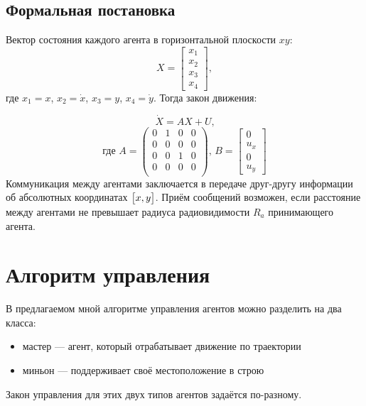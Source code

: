 \documentclass[a4paper, 14pt]{extarticle}
\let\Oldsection\section
\renewcommand{\section}{\FloatBarrier\Oldsection}
\let\Oldsubsection\subsection
\renewcommand{\subsection}{\FloatBarrier\Oldsubsection}
\begin{document}
\subsection{Формальная постановка}
Вектор состояния каждого агента в горизонтальной плоскости $xy$:
$$ X = 
\begin{bmatrix}
	x_1 \\
	x_2 \\
	x_3 \\
	x_4
\end{bmatrix} ,
$$
где $x_1 = x$, $x_2 = \dot{x}$, $x_3 = y$, $x_4 = \dot{y}$. Тогда закон движения: \par
$$\dot{X} = AX + U\text{,}$$
$$\text{где } A =  \left(\begin{array}{cccc} 0 & 1 & 0 & 0 \\ 0 & 0 & 0 & 0 \\ 0 & 0 & 1 & 0 \\ 0 & 0 & 0 & 0 \\ \end{array}\right) \text{, } 
 B = 
 \begin{bmatrix}
 0 \\
 u_x \\
 0 \\
 u_y
 \end{bmatrix} 
$$
Коммуникация между агентами заключается в передаче друг-другу информации об абсолютных координатах $\big{[}x, y\big{]}$. Приём сообщений возможен, если расстояние между агентами не превышает радиуса радиовидимости $R_a$ принимающего агента. \par 
\section{Алгоритм управления}
В предлагаемом мной алгоритме управления агентов можно разделить на два класса:
\begin{itemize}
	\item мастер — агент, который отрабатывает движение по траектории
	\item миньон — поддерживает своё местоположение в строю
\end{itemize}
Закон управления для этих двух типов агентов задаётся по-разному.
\end{document}
